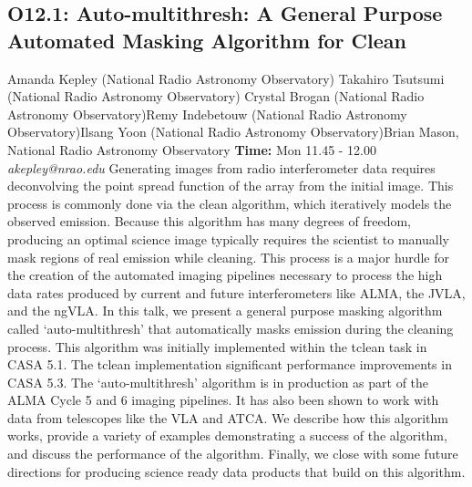 \documentclass{report}
\begin{document}
\subsection*{O12.1: Auto-multithresh: A General Purpose Automated Masking Algorithm for Clean}
\bigskip
Amanda Kepley (National Radio Astronomy Observatory) \newline Takahiro Tsutsumi (National Radio Astronomy Observatory) \newline  Crystal Brogan (National Radio Astronomy Observatory)\newline  Remy Indebetouw (National Radio Astronomy Observatory)\newline Ilsang Yoon (National Radio Astronomy Observatory)\newline  Brian Mason, National Radio Astronomy Observatory\newline\newline
{\bf Time:} Mon 11.45 - 12.00\newline
\newline
{\it akepley@nrao.edu}\newline
\newline\newline
Generating images from radio interferometer data requires deconvolving the point spread function of the array from the initial image. This process is commonly done via the clean algorithm, which iteratively models the observed emission. Because this algorithm has many degrees of freedom, producing an optimal science image typically requires the scientist to manually mask regions of real emission while cleaning. This process is a major hurdle for the creation of the automated imaging pipelines necessary to process the high data rates produced by current and future interferometers like ALMA, the JVLA, and the ngVLA. In this talk, we present a general purpose masking algorithm called ‘auto-multithresh’ that automatically masks emission during the cleaning process. This algorithm was initially implemented within the tclean task in CASA 5.1. The tclean implementation significant performance improvements in CASA 5.3. The ‘auto-multithresh’ algorithm is in production as part of the ALMA Cycle 5 and 6 imaging pipelines. It has also been shown to work with data from telescopes like the VLA and ATCA. We describe how this algorithm works, provide a variety of examples demonstrating a success of the algorithm, and discuss the performance of the algorithm. Finally, we close with some future directions for producing science ready data products that build on this algorithm.\newline
\newpage
\end{document}
